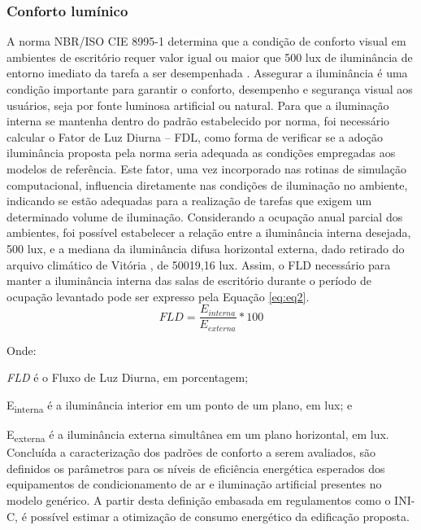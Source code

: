 \subsubsection{Conforto lumínico}
A norma NBR/ISO CIE 8995-1 \cite{AssociacaoBrasileiradeNormasTecnicas-ABNT2013} determina que a condição de conforto visual 
em ambientes de escritório requer valor igual ou maior que 500 lux de iluminância de entorno 
imediato da tarefa a ser desempenhada \cite{AssociacaoBrasileiradeNormasTecnicas-ABNT2013,Ramos2013}. Assegurar a 
iluminância é uma condição importante para garantir o conforto, desempenho e segurança visual 
aos usuários, seja por fonte luminosa artificial ou natural.\vspace*{0.3cm} \newline
Para que a iluminação interna se mantenha dentro do padrão estabelecido por norma, foi 
necessário calcular o Fator de Luz Diurna – FDL, como forma de verificar se a adoção 
iluminância proposta pela norma seria adequada as condições empregadas aos modelos de 
referência. Este fator, uma vez incorporado nas rotinas de simulação computacional, 
influencia diretamente nas condições de iluminação no ambiente, indicando se estão adequadas 
para a realização de tarefas que exigem um determinado volume de iluminação.\vspace*{0.3cm} \newline
Considerando a ocupação anual parcial dos ambientes, foi possível estabelecer a relação 
entre a iluminância interna desejada, 500 lux, e a mediana da iluminância difusa horizontal 
externa, dado retirado do arquivo climático de Vitória \cite{InstitutoNacionaldeMetrologiaNormalizacaoeQualidadeIndustrial-INMETRO2018}, de 50019,16 lux. 
Assim, o FLD necessário para manter a iluminância interna das salas de escritório durante o 
período de ocupação levantado pode ser expresso pela Equação \ref{eq:eq2}.
\begin{equation}\label{eq:eq2}
    FLD=\frac{E_{interna}}{E_{externa}}*100
\end{equation}

Onde:\par
\setlength\parindent{1.5cm} \textit{FLD} é o Fluxo de Luz Diurna, em porcentagem;\par
\setlength\parindent{1.5cm} E\textsubscript{interna} é a iluminância interior em um ponto de um plano, em lux; e\par
\setlength\parindent{1.5cm} E\textsubscript{externa} é a iluminância externa simultânea em um plano horizontal, em lux.\vspace*{0.3cm} \newline
\noindent Concluída a caracterização dos padrões de conforto a serem avaliados, são definidos os 
parâmetros para os níveis de eficiência energética esperados dos equipamentos de 
condicionamento de ar e iluminação artificial presentes no modelo genérico. A partir desta 
definição embasada em regulamentos como o INI-C, é possível estimar a otimização de consumo 
energético da edificação proposta.